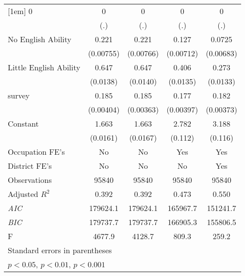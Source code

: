 \begin{table}[htbp]
\begin{tabular}{l*{4}{c}}
[1em]
0               &        0         &        0         &        0         &        0         \\
                &      (.)         &      (.)         &      (.)         &      (.)         \\
[1em]
No English Ability&    0.221\sym{***}&    0.221\sym{***}&    0.127\sym{***}&   0.0725\sym{***}\\
                &(0.00755)         &(0.00766)         &(0.00712)         &(0.00683)         \\
[1em]
Little English Ability&    0.647\sym{***}&    0.647\sym{***}&    0.406\sym{***}&    0.273\sym{***}\\
                & (0.0138)         & (0.0140)         & (0.0135)         & (0.0133)         \\
[1em]
survey          &    0.185\sym{***}&    0.185\sym{***}&    0.177\sym{***}&    0.182\sym{***}\\
                &(0.00404)         &(0.00363)         &(0.00397)         &(0.00373)         \\
[1em]
Constant        &    1.663\sym{***}&    1.663\sym{***}&    2.782\sym{***}&    3.188\sym{***}\\
                & (0.0161)         & (0.0167)         &  (0.112)         &  (0.116)         \\
[1em]
Occupation FE's &       No         &       No         &      Yes         &      Yes         \\
[1em]
District FE's   &       No         &       No         &       No         &      Yes         \\
\hline
Observations    &    95840         &    95840         &    95840         &    95840         \\
Adjusted \(R^{2}\)&    0.392         &    0.392         &    0.473         &    0.550         \\
\textit{AIC}    & 179624.1         & 179624.1         & 165967.7         & 151241.7         \\
\textit{BIC}    & 179737.7         & 179737.7         & 166905.3         & 155806.5         \\
F               &   4677.9         &   4128.7         &    809.3         &    259.2         \\
\hline\hline
\multicolumn{5}{l}{\footnotesize Standard errors in parentheses}\\
\multicolumn{5}{l}{\footnotesize \sym{*} \(p<0.05\), \sym{**} \(p<0.01\), \sym{***} \(p<0.001\)}\\
\end{tabular}
\end{table}
